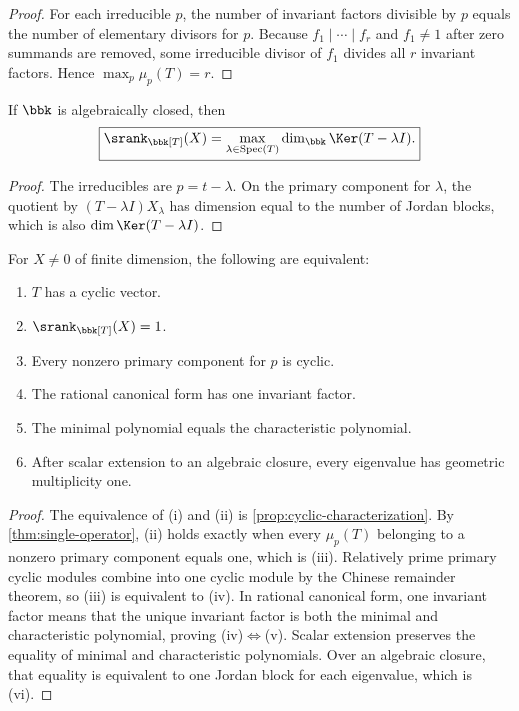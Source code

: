 \begin{proof}
For each irreducible $p$, the number of invariant factors divisible by $p$ equals the number of elementary divisors for $p$.  Because $f_1\mid\cdots\mid f_r$ and $f_1\neq1$ after zero summands are removed, some irreducible divisor of $f_1$ divides all $r$ invariant factors.  Hence $\max_p\mu_p(T)=r$.
\end{proof}

\begin{corollary}
\label{cor:geometric-multiplicity}
If $\bbk$ is algebraically closed, then
\[
\boxed{
\srank_{\bbk[T]}(X)
=
\max_{\lambda\in\operatorname{Spec}(T)}
\dim_{\bbk}\Ker(T-\lambda I).
}
\]
\end{corollary}

\begin{proof}
The irreducibles are $p=t-\lambda$.  On the primary component for $\lambda$, the quotient by $(T-\lambda I)X_\lambda$ has dimension equal to the number of Jordan blocks, which is also $\dim\Ker(T-\lambda I)$.
\end{proof}

\begin{corollary}
\label{cor:cyclic-matrix}
For $X\ne0$ of finite dimension, the following are equivalent:
\begin{enumerate}[label=(\roman*)]
\item $T$ has a cyclic vector.
\item $\srank_{\bbk[T]}(X)=1$.
\item Every nonzero primary component for $p$ is cyclic.
\item The rational canonical form has one invariant factor.
\item The minimal polynomial equals the characteristic polynomial.
\item After scalar extension to an algebraic closure, every eigenvalue has geometric multiplicity one.
\end{enumerate}
\end{corollary}

\begin{proof}
The equivalence of (i) and (ii) is \cref{prop:cyclic-characterization}.  By \cref{thm:single-operator}, (ii) holds exactly when every $\mu_p(T)$ belonging to a nonzero primary component equals one, which is (iii).  Relatively prime primary cyclic modules combine into one cyclic module by the Chinese remainder theorem, so (iii) is equivalent to (iv).  In rational canonical form, one invariant factor means that the unique invariant factor is both the minimal and characteristic polynomial, proving (iv)$\Leftrightarrow$(v).  Scalar extension preserves the equality of minimal and characteristic polynomials.  Over an algebraic closure, that equality is equivalent to one Jordan block for each eigenvalue, which is (vi).
\end{proof}

